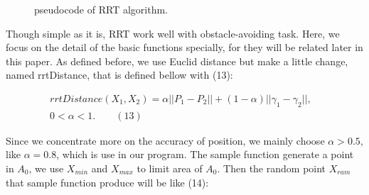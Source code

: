 \documentclass[letterpaper, 10 pt, conference]{ieeeconf}  %
\begin{document}
\begin{figure}[thpb]
      \centering
      \caption{pseudocode of RRT algorithm.}
      \label{figurelabe2}
\end{figure}
 
 Though simple as it is, RRT work well with obstacle-avoiding task. Here, we focus on the detail of the basic functions specially, for they will be related later in this paper. As defined before, we use Euclid distance but make a little change, named rrtDistance, that is defined bellow with (13):
 

 $$
   \begin{aligned}
 rrtDistance(X_{1},X_{2})=\alpha ||P_{1}-P_{2}|| + (1-\alpha) ||\gamma_{1}-\gamma_{2}||, &\\
 0 < \alpha < 1. \qquad (13)
    \end{aligned}
 $$

   
 Since we concentrate more on the accuracy of position, we mainly choose $\alpha > 0.5$, like $\alpha = 0.8$, which is use in our program.  The sample function generate a point in $A_{0}$, we use $X_{min}$ and $X_{max}$ to limit area of $A_{0}$. Then the random point $X_{ram}$ that sample function produce will be like (14):
 
\end{document}

